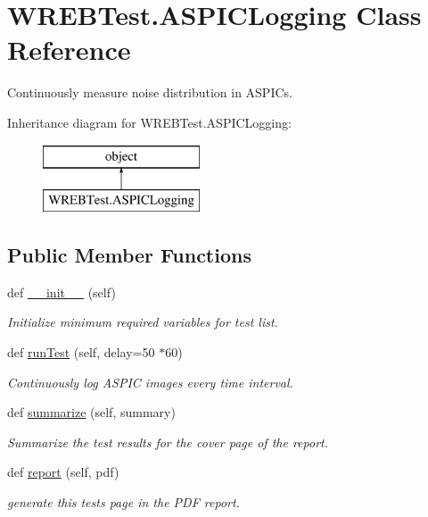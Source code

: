 \hypertarget{class_w_r_e_b_test_1_1_a_s_p_i_c_logging}{}\section{W\+R\+E\+B\+Test.\+A\+S\+P\+I\+C\+Logging Class Reference}
\label{class_w_r_e_b_test_1_1_a_s_p_i_c_logging}


Continuously measure noise distribution in A\+S\+P\+I\+Cs.  


Inheritance diagram for W\+R\+E\+B\+Test.\+A\+S\+P\+I\+C\+Logging\+:\begin{figure}[H]
\begin{center}
\leavevmode
\includegraphics[height=2.000000cm]{class_w_r_e_b_test_1_1_a_s_p_i_c_logging}
\end{center}
\end{figure}
\subsection*{Public Member Functions}
\begin{DoxyCompactItemize}
\item 
def \hyperlink{class_w_r_e_b_test_1_1_a_s_p_i_c_logging_aa57be40a690bbce4458df52fbd61cac3}{\+\_\+\+\_\+init\+\_\+\+\_\+} (self)
\begin{DoxyCompactList}\small\item\em Initialize minimum required variables for test list. \end{DoxyCompactList}\item 
def \hyperlink{class_w_r_e_b_test_1_1_a_s_p_i_c_logging_ab6382a12a1bc12f9865f0a1d8d49acff}{run\+Test} (self, delay=50 $\ast$60)
\begin{DoxyCompactList}\small\item\em Continuously log A\+S\+P\+IC images every time interval. \end{DoxyCompactList}\item 
def \hyperlink{class_w_r_e_b_test_1_1_a_s_p_i_c_logging_a4189d090fcfd601127caa7c59edeb3a1}{summarize} (self, summary)
\begin{DoxyCompactList}\small\item\em Summarize the test results for the cover page of the report. \end{DoxyCompactList}\item 
def \hyperlink{class_w_r_e_b_test_1_1_a_s_p_i_c_logging_a0913af7afc258f537e6a7dc6c5b42bdb}{report} (self, pdf)
\begin{DoxyCompactList}\small\item\em generate this test\textquotesingle{}s page in the P\+DF report. \end{DoxyCompactList}\end{DoxyCompactItemize}


